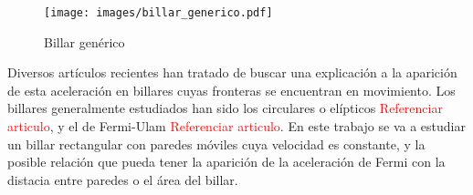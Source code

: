 \begin{figure}[H]
    \centering
    \texttt{[image: images/billar\_generico.pdf]}
    \caption{Billar genérico}
    \label{fig:bilar_generico}
\end{figure}

Diversos artículos recientes han tratado de buscar una explicación a la aparición de esta aceleración en billares cuyas fronteras se encuentran en movimiento. Los billares generalmente estudiados han sido los circulares o elípticos \textcolor{red}{Referenciar articulo}, y el de Fermi-Ulam \textcolor{red}{Referenciar articulo}. En este trabajo se va a estudiar un billar rectangular con paredes móviles cuya velocidad es constante, y la posible relación que pueda tener la aparición de la aceleración de Fermi con la distacia entre paredes o el área del billar.

%